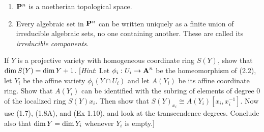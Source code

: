 \documentclass[10pt]{amsart}
\begin{document}
\begin{solution}

\end{solution}

\begin{exercise}[2.5]
    \begin{enumerate}
        \item $\bbP^n$ is a noetherian topological space. 
        \item Every algebraic set in $\bbP^n$ can be written uniquely as a finite
          union of irreducible algebraic sets, no one containing another. These are
          called its \emph{irreducible components}. 
    \end{enumerate}
\end{exercise}

\begin{solution}

\end{solution}

\begin{exercise}[2.6]
    If $Y$ is a projective variety with homogeneous coordinate ring $S(Y)$, show that $\Dim S(Y) = \Dim Y + 1$. 
    [\emph{Hint}: Let $\phi_i: U_i \to \aa^n$ be the homeomorphism of (2.2), 
    let $Y_i$ be the affine variety $\phi_i(Y \cap U_i)$ and let $A(Y_i)$ be its affine coordinate ring.
    Show that $A(Y_i)$ can be identified with the subring of elements of degree 0 of the 
    localized ring $S(Y)x_i$. Then show that $S(Y)_{x_i} \cong A(Y_i)[x_i, x_i^{-1}]$. 
    Now use (1.7), (1.8A), and (Ex 1.10), and look at the transcendence degrees. Conclude also that 
    $\Dim Y = \Dim Y_i$ whenever $Y_i$ is empty.]
\end{exercise}
\end{document}
